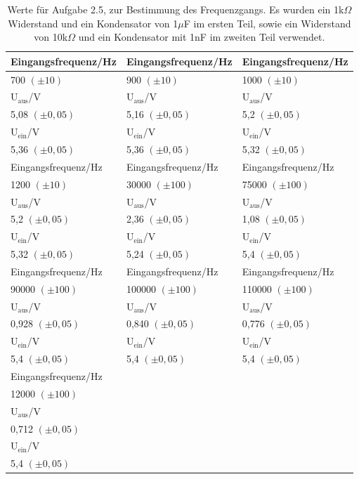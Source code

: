 \documentclass[12pt]{scrartcl}
\begin{document}
\begin{table}[H]
\caption{Werte für Aufgabe 2.5, zur Bestimmung des Frequenzgangs. Es wurden ein 1k$\Omega$ Widerstand  und ein Kondensator von 1$\mu$F im ersten Teil, sowie ein Widerstand von 10k$\Omega$ und ein Kondensator mit 1nF im zweiten Teil verwendet.}
\begin{center}
\begin{tabular}{|l|l|l|}
\hline
Eingangsfrequenz/Hz & Eingangsfrequenz/Hz & Eingangsfrequenz/Hz \\ \hline
700  $(\pm 10)$ & 900 $(\pm 10)$ & 1000 $(\pm 10)$ \\ \hline
U$_\text{aus}$/V & U$_\text{aus}$/V & U$_\text{aus}$/V \\ \hline
5,08 $(\pm 0,05)$ & 5,16 $(\pm 0,05)$ & 5,2 $(\pm 0,05)$ \\ \hline
U$_\text{ein}$/V & U$_\text{ein}$/V & U$_\text{ein}$/V \\ \hline
5,36 $(\pm 0,05)$ & 5,36 $(\pm 0,05)$ & 5,32 $(\pm 0,05)$ \\ \hline \hline
Eingangsfrequenz/Hz & Eingangsfrequenz/Hz & Eingangsfrequenz/Hz \\ \hline
1200 $(\pm 10)$ & 30000 $(\pm 100)$ & 75000 $(\pm 100)$ \\ \hline
U$_\text{aus}$/V & U$_\text{aus}$/V & U$_\text{aus}$/V \\ \hline
5,2 $(\pm 0,05)$ & 2,36 $(\pm 0,05)$ & 1,08 $(\pm 0,05)$ \\ \hline
U$_\text{ein}$/V & U$_\text{ein}$/V & U$_\text{ein}$/V \\ \hline
5,32 $(\pm 0,05)$ & 5,24 $(\pm 0,05)$ & 5,4 $(\pm 0,05)$ \\ \hline \hline
Eingangsfrequenz/Hz & Eingangsfrequenz/Hz & Eingangsfrequenz/Hz \\ \hline
90000 $(\pm 100)$ & 100000 $(\pm 100)$ & 110000 $(\pm 100)$ \\ \hline
U$_\text{aus}$/V & U$_\text{aus}$/V & U$_\text{aus}$/V \\ \hline
0,928  $(\pm 0,05)$ & 0,840 $(\pm 0,05)$ & 0,776 $(\pm 0,05)$ \\ \hline
U$_\text{ein}$/V & U$_\text{ein}$/V & U$_\text{ein}$/V \\ \hline
5,4 $(\pm 0,05)$ & 5,4 $(\pm 0,05)$ & 5,4 $(\pm 0,05)$ \\ \hline \hline
Eingangsfrequenz/Hz &  &  \\ \hline
12000 $(\pm 100)$ &  &  \\ \hline
U$_\text{aus}$/V &  &  \\ \hline
0,712  $(\pm 0,05)$ &  &  \\ \hline
U$_\text{ein}$/V &  &  \\ \hline
5,4  $(\pm 0,05)$ &  &  \\ \hline
\end{tabular}
\end{center}
\label{tab:2.5}
\end{table}
\end{document}
